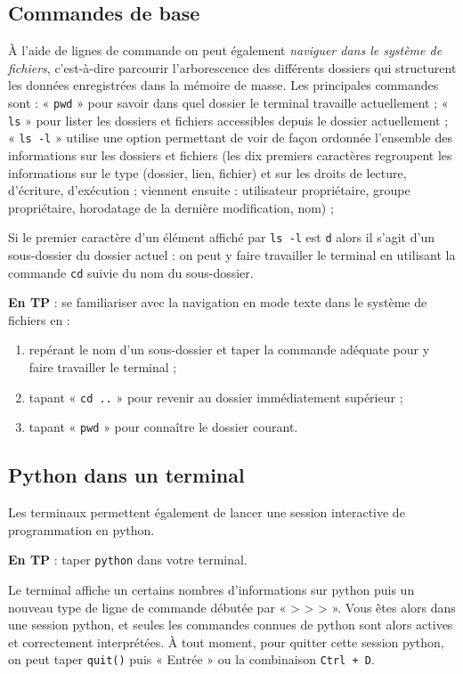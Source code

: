 \subsection{Commandes de base}
À l'aide de lignes de commande on peut également \textit{naviguer dans le système de fichiers}, c'est-à-dire parcourir l'arborescence des différents dossiers qui structurent les données enregistrées dans la mémoire de masse. Les principales commandes sont :
« \texttt{pwd} » pour savoir dans quel dossier le terminal travaille actuellement ; 
« \texttt{ls} » pour lister les dossiers et fichiers accessibles depuis le dossier actuellement ;
« \texttt{ls -l} » utilise une option permettant de voir de façon ordonnée l'ensemble des informations sur les dossiers et fichiers (les dix premiers caractères regroupent les informations sur le type (dossier, lien, fichier) et sur les droits de lecture, d'écriture, d'exécution ; viennent ensuite : utilisateur propriétaire, groupe propriétaire, horodatage de la dernière modification, nom) ;

Si le premier caractère d'un élément affiché par \texttt{ls -l} est \texttt{d} alors il s'agit d'un sous-dossier du dossier actuel : on peut y faire travailler le terminal en utilisant la commande \texttt{cd} suivie du nom du sous-dossier.

\textbf{En TP} : se familiariser avec la navigation en mode texte dans le système de fichiers en :
\begin{enumerate}
\item repérant le nom d'un sous-dossier et taper la commande adéquate pour y faire travailler le terminal ;
\item tapant « \texttt{cd ..} » pour revenir au dossier immédiatement supérieur ;
\item tapant « \texttt{pwd} » pour connaître le dossier courant.
\end{enumerate}


\subsection{Python dans un terminal}
\label{Python dans un terminal}

Les terminaux permettent également de lancer une session interactive de programmation en python.

\textbf{En TP} : taper \texttt{python} dans votre terminal.

Le terminal affiche un certains nombres d'informations sur python puis un nouveau type de ligne de commande débutée par « > > > ». Vous êtes alors dans une session python, et seules les commandes connues de python sont alors actives et correctement interprétées. À tout moment, pour quitter cette session python, on peut taper \texttt{quit()} puis « Entrée » ou la combinaison \texttt{Ctrl + D}.

